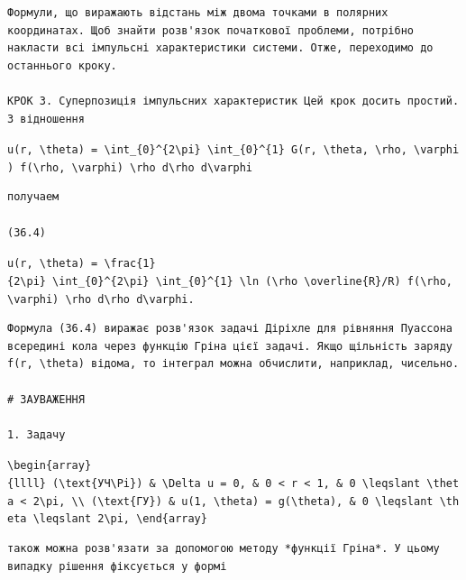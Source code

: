 \documentclass[
  ukrainian,
]{article}
\begin{document}
\begin{verbatim}
Формули, що виражають відстань між двома точками в полярних координатах. Щоб знайти розв'язок початкової проблеми, потрібно накласти всі імпульсні характеристики системи. Отже, переходимо до останнього кроку.

КРОК 3. Суперпозиція імпульсних характеристик Цей крок досить простий. З відношення
\end{verbatim}

\texttt{u(r,\ \textbackslash{}theta)\ =\ \textbackslash{}int\_\{0\}\^{}\{2\textbackslash{}pi\}\ \textbackslash{}int\_\{0\}\^{}\{1\}\ G(r,\ \textbackslash{}theta,\ \textbackslash{}rho,\ \textbackslash{}varphi)\ f(\textbackslash{}rho,\ \textbackslash{}varphi)\ \textbackslash{}rho\ d\textbackslash{}rho\ d\textbackslash{}varphi}

\begin{verbatim}
получаем

(36.4)
\end{verbatim}

\texttt{u(r,\ \textbackslash{}theta)\ =\ \textbackslash{}frac\{1\}\{2\textbackslash{}pi\}\ \textbackslash{}int\_\{0\}\^{}\{2\textbackslash{}pi\}\ \textbackslash{}int\_\{0\}\^{}\{1\}\ \textbackslash{}ln\ (\textbackslash{}rho\ \textbackslash{}overline\{R\}/R)\ f(\textbackslash{}rho,\ \textbackslash{}varphi)\ \textbackslash{}rho\ d\textbackslash{}rho\ d\textbackslash{}varphi.}

\begin{verbatim}
Формула (36.4) виражає розв'язок задачі Діріхле для рівняння Пуассона всередині кола через функцію Гріна цієї задачі. Якщо щільність заряду f(r, \theta) відома, то інтеграл можна обчислити, наприклад, чисельно.

# ЗАУВАЖЕННЯ

1. Задачу
\end{verbatim}

\texttt{\textbackslash{}begin\{array\}\{llll\}\ (\textbackslash{}text\{УЧ\textbackslash{}Pi\})\ \&\ \textbackslash{}Delta\ u\ =\ 0,\ \&\ 0\ \textless{}\ r\ \textless{}\ 1,\ \&\ 0\ \textbackslash{}leqslant\ \textbackslash{}theta\ \textless{}\ 2\textbackslash{}pi,\ \textbackslash{}\textbackslash{}\ (\textbackslash{}text\{ГУ\})\ \&\ u(1,\ \textbackslash{}theta)\ =\ g(\textbackslash{}theta),\ \&\ 0\ \textbackslash{}leqslant\ \textbackslash{}theta\ \textbackslash{}leqslant\ 2\textbackslash{}pi,\ \textbackslash{}end\{array\}}

\begin{verbatim}
також можна розв'язати за допомогою методу *функції Гріна*. У цьому випадку рішення фіксується у формі
\end{verbatim}
\end{document}
